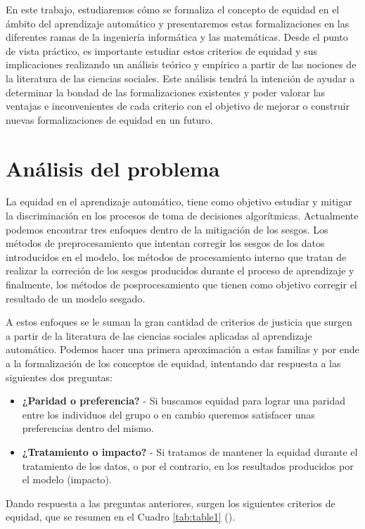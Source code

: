 \documentclass[oneside,openright,titlepage,numbers=noenddot,openany,headinclude,footinclude=true,
cleardoublepage=empty,abstractoff,BCOR=5mm,paper=a4,fontsize=12pt,main=spanish]{scrreprt}
\begin{document}
En este trabajo, estudiaremos cómo se formaliza el concepto de equidad en el ámbito del aprendizaje automático y presentaremos estas formalizaciones en las diferentes ramas de la ingeniería informática y las matemáticas. Desde el punto de vista práctico, es importante estudiar estos criterios de equidad y sus implicaciones realizando un análisis teórico y empírico a partir de las nociones de la literatura de las ciencias sociales. Este análisis tendrá la intención de ayudar a determinar la bondad de las formalizaciones existentes y poder valorar las ventajas e inconvenientes de cada criterio con el objetivo de mejorar o construir nuevas formalizaciones de equidad en un futuro. 

\section{Análisis del problema}

La equidad en el aprendizaje automático, tiene como objetivo estudiar y mitigar la discriminación en los procesos de toma de decisiones algorítmicas. Actualmente podemos encontrar tres enfoques dentro de la mitigación de los sesgos. Los métodos de preprocesamiento que intentan corregir los sesgos de los datos introducidos en el modelo, los métodos de procesamiento interno que tratan de realizar la correción de los sesgos producidos durante el proceso de aprendizaje y finalmente, los métodos de posprocesamiento que tienen como objetivo corregir el resultado de un modelo sesgado.

A estos enfoques se le suman la gran cantidad de criterios de justicia que surgen a partir de la literatura de las ciencias sociales aplicadas al aprendizaje automático. Podemos hacer una primera aproximación a estas familias y por ende a la formalización de los conceptos de equidad, intentando dar respuesta a las siguientes dos preguntas:

\begin{itemize}
    \item \textbf{¿Paridad o preferencia?} - Si buscamos equidad para lograr una paridad entre los individuos del grupo o en cambio queremos satisfacer unas preferencias dentro del mismo.
    \item \textbf{¿Tratamiento o impacto?} - Si tratamos de mantener la equidad durante el tratamiento de los datos, o por el contrario, en los resultados producidos por el modelo (impacto).
\end{itemize}

Dando respuesta a las preguntas anteriores, surgen los siguientes criterios de equidad, que se resumen en el Cuadro \ref{tab:table1} (\cite{formalizing2018}).\\
\end{document}
